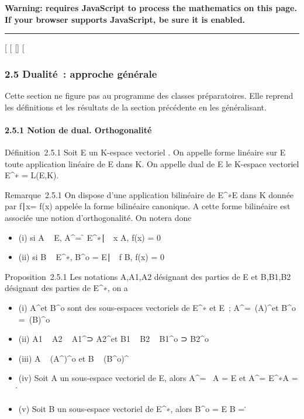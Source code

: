 \textbf{Warning: 
requires JavaScript to process the mathematics on this page.\\ If your
browser supports JavaScript, be sure it is enabled.}

\begin{center}\rule{3in}{0.4pt}\end{center}

{[}
{[}
{[}{]}
{[}

\subsubsection{2.5 Dualité~: approche générale}

Cette section ne figure pas au programme des classes préparatoires. Elle
reprend les définitions et les résultats de la section précédente en les
généralisant.

\paragraph{2.5.1 Notion de dual. Orthogonalité}

Définition~2.5.1 Soit E un K-espace vectoriel . On appelle forme
linéaire sur E toute application linéaire de E dans K. On appelle dual
de E le K-espace vectoriel E^∗ = L(E,K).

Remarque~2.5.1 On dispose d'une application bilinéaire de
E^∗\times E dans K donnée par \langle
f∣x\rangle = f(x) appelée la
forme bilinéaire canonique. A cette forme bilinéaire est associée une
notion d'orthogonalité. On notera donc

\begin{itemize}
\itemsep1pt\parskip0pt
\item
  (i) si A \subset~ E, A^\bot = \f \in
  E^∗∣\forall~~x
  \in A, f(x) = 0\
\item
  (ii) si B \subset~ E^∗, B^o = \x \in
  E∣\forall~~f \in B, f(x) =
  0\
\end{itemize}

Proposition~2.5.1 Les notations A,A1,A2 désignant
des parties de E et B,B1,B2 désignant des parties de
E^∗, on a

\begin{itemize}
\itemsep1pt\parskip0pt
\item
  (i) A^\bot et B^o sont des sous-espaces vectoriels
  de E^∗ et E~; A^\bot =\
  \mathrmVect(A)^\bot et B^o
  =\
  \mathrmVect(B)^o
\item
  (ii) A1 \subset~ A2 \rigtharrow~ A1^\bot⊃
  A2^\bot et B1 \subset~ B2 \rigtharrow~
  B1^o ⊃ B2^o
\item
  (iii) A \subset~ (A^\bot)^o et B \subset~
  (B^o)^\bot
\item
  (iv) Soit A un sous-espace vectoriel de E, alors A^\bot =
  \0\ \Leftrightarrow A =
  E et A^\bot = E^∗\Leftrightarrow A =
  \0\.
\item
  (v) Soit B un sous-espace vectoriel de E^∗, alors
  B^o = E \Leftrightarrow B =
  \0\.
\end{itemize}

